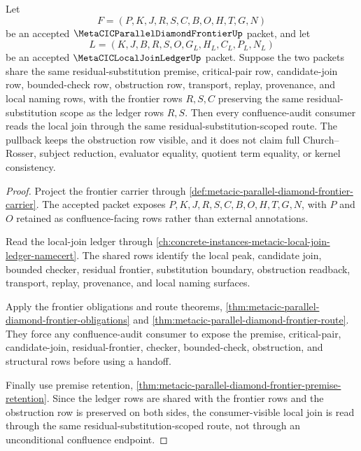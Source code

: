 \begin{theorem}
\label{thm:metacic-parallel-diamond-frontier-local-join-ledger-pullback}
Let
$$
F=(P,K,J,R,S,C,B,O,H,T,G,N)
$$
be an accepted $\MetaCICParallelDiamondFrontierUp$ packet, and let
$$
L=(K,J,B,R,S,O,G_L,H_L,C_L,P_L,N_L)
$$
be an accepted $\MetaCICLocalJoinLedgerUp$ packet. Suppose the two packets share the same residual-substitution premise, critical-pair row, candidate-join row, bounded-check row, obstruction row, transport, replay, provenance, and local naming rows, with the frontier rows $R,S,C$ preserving the same residual-substitution scope as the ledger rows $R,S$. Then every confluence-audit consumer reads the local join through the same residual-substitution-scoped route. The pullback keeps the obstruction row visible, and it does not claim full Church--Rosser, subject reduction, evaluator equality, quotient term equality, or kernel consistency.
\end{theorem}
\begin{proof}
Project the frontier carrier through \autoref{def:metacic-parallel-diamond-frontier-carrier}. The accepted packet exposes $P,K,J,R,S,C,B,O,H,T,G,N$, with $P$ and $O$ retained as confluence-facing rows rather than external annotations.

Read the local-join ledger through \autoref{ch:concrete-instances-metacic-local-join-ledger-namecert}. The shared rows identify the local peak, candidate join, bounded checker, residual frontier, substitution boundary, obstruction readback, transport, replay, provenance, and local naming surfaces.

Apply the frontier obligations and route theorems, \autoref{thm:metacic-parallel-diamond-frontier-obligations} and \autoref{thm:metacic-parallel-diamond-frontier-route}. They force any confluence-audit consumer to expose the premise, critical-pair, candidate-join, residual-frontier, checker, bounded-check, obstruction, and structural rows before using a handoff.

Finally use premise retention, \autoref{thm:metacic-parallel-diamond-frontier-premise-retention}. Since the ledger rows are shared with the frontier rows and the obstruction row is preserved on both sides, the consumer-visible local join is read through the same residual-substitution-scoped route, not through an unconditional confluence endpoint.
\end{proof}

